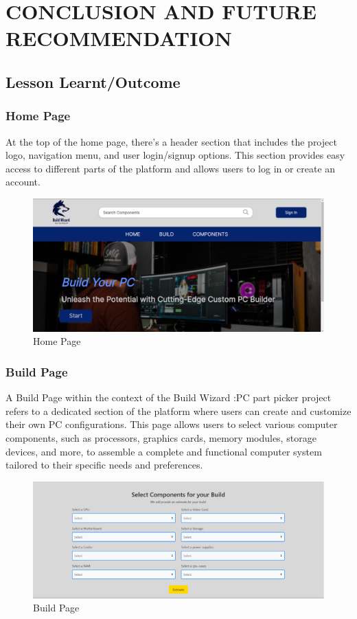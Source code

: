 \chapter{CONCLUSION AND FUTURE RECOMMENDATION}
\section{Lesson Learnt/Outcome}
\subsection{Home Page}
At the top of the home page, there's a header section that includes the project logo, navigation menu, and user login/signup options. This section provides easy access to different parts of the platform and allows users to log in or create an account.
\begin{figure}[H]
\includegraphics[width=15cm]{Diagrams/UIHOME.png}
\caption{Home Page}
\end{figure}
\newpage
\subsection{Build Page}
A Build Page within the context of the Build Wizard :PC part picker project refers to a dedicated section of the platform where users can create and customize their own PC configurations. This page allows users to select various computer components, such as processors, graphics cards, memory modules, storage devices, and more, to assemble a complete and functional computer system tailored to their specific needs and preferences.
\begin{figure}[H]
\centering
\includegraphics[width=16cm]{Diagrams/newbuildpage.png}
\caption{Build Page}
\end{figure}
